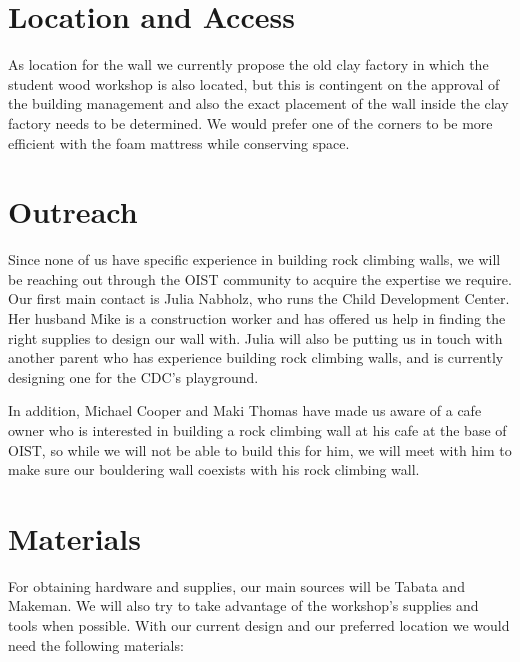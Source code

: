 \documentclass{scrartcl}
\begin{document}
\section{Location and Access}
As location for the wall we currently propose the old clay factory in which the student wood workshop is also located, but this is contingent on the approval of the building management and also the exact placement of the wall inside the clay factory needs to be determined. We would prefer one of the corners to be more efficient with the foam mattress while conserving space.
\section{Outreach}
Since none of us have specific experience in building rock climbing walls, we will be reaching out through the OIST community to acquire the expertise we require. Our first main contact is Julia Nabholz, who runs the Child Development Center. Her husband Mike is a construction worker and has offered us help in finding the right supplies to design our wall with. Julia will also be putting us in touch with another parent who has experience building rock climbing walls, and is currently designing one for the CDC's playground.

In addition, Michael Cooper and Maki Thomas have made us aware of a cafe owner who is interested in building a rock climbing wall at his cafe at the base of OIST, so while we will not be able to build this for him, we will meet with him to make sure our bouldering wall coexists with his rock climbing wall.

\section{Materials}
For obtaining hardware and supplies, our main sources will be Tabata and Makeman. We will also try to take advantage of the workshop’s supplies and tools when possible. With our current design and our preferred location we would need the following materials:
\end{document}
